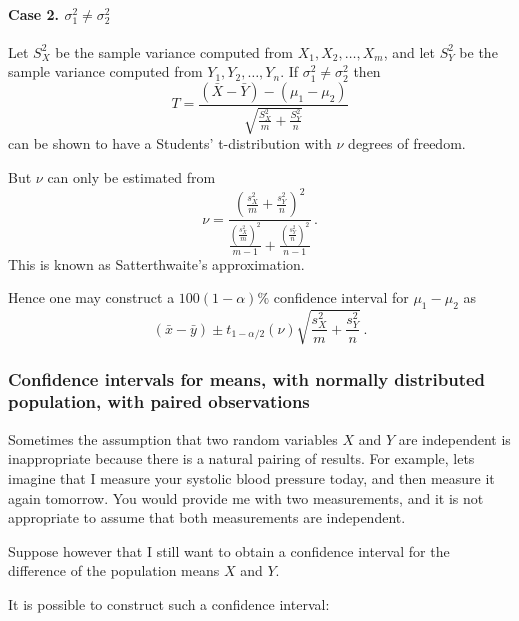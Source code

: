 \documentclass[12pt]{article}
\theoremstyle{break}
\begin{document}
\paragraph{Case 2. $\sigma_{1}^{2} \neq \sigma_{2}^{2}$}
Let $S_{X}^{2}$ be the sample variance computed from $X_{1},X_{2},\ldots, X_{m}$, and let $S_{Y}^{2}$ be the sample variance computed from $Y_{1},Y_{2},\ldots,Y_{n}$.
If $\sigma_{1}^{2} \neq \sigma_{2}^{2}$ then
$$
T=\frac{(\bar{X}-\bar{Y})-(\mu_{1}-\mu_{2})}{\sqrt{\frac{S_{X}^{2}}{m}+\frac{S_{Y}^{2}}{n}}}
$$
can be shown to have a Students' t-distribution with $\nu$ degrees of freedom.

But $\nu$ can only be estimated from
$$
\nu=\frac{\left(\frac{s_{X}^{2}}{m}+\frac{s_{Y}^{2}}{n}\right)^2}{\frac{\left(\frac{s_{X}^{2}}{m}\right)^2}{m-1}+\frac{\left(\frac{s_{Y}^{2}}{n}\right)^2}{n-1}} \,.
$$
This is known as Satterthwaite's approximation.

Hence one may construct a $100(1-\alpha)\%$ confidence interval for $\mu_{1}-\mu_{2}$ as
$$
(\bar{x}-\bar{y}) \pm t_{1-\alpha/2}(\nu)\sqrt{\frac{s_{X}^{2}}{m}+\frac{s_{Y}^{2}}{n}}\, .
$$

\subsubsection{Confidence intervals for means, with normally distributed population, with paired observations}
Sometimes the assumption that two random variables $X$ and $Y$ are independent is inappropriate because there is a natural pairing of results. For example, lets imagine that I measure your systolic blood pressure today, and then measure it again tomorrow. You would provide me with two measurements, and it is not appropriate to assume that both measurements are independent.

Suppose however that I still want to obtain a confidence interval for the difference of the population means $X$ and $Y$.
\begin{mdframed}
{It is possible to construct such a confidence interval:}
\textcolor[rgb]{1.00,1.00,1.00}{\lipsum[1-4]}
\end{mdframed}
\end{document}
